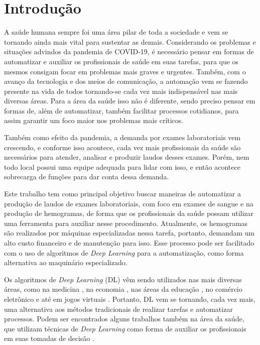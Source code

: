 \chapter{Introdução}
\label{chap:introducao}

A saúde humana sempre foi uma área pilar de toda a sociedade e vem se tornando ainda mais vital para sustentar as demais. Considerando os problemas e situações advindos da pandemia de COVID-19, é necessário pensar em formas de automatizar e auxiliar os profissionais de saúde em suas tarefas, para que os mesmos consigam focar em problemas mais graves e urgentes. Também, com o avanço da tecnologia e dos meios de comunicação, a automação vem se fazendo presente na vida de todos tornando-se cada vez mais indispensável nas mais diversas áreas. Para a área da saúde isso não é diferente, sendo preciso pensar em formas de, além de automatizar, também facilitar processos cotidianos, para assim garantir um foco maior nos problemas mais críticos.

Também como efeito da pandemia, a demanda por exames laboratoriais vem crescendo, e conforme isso acontece, cada vez mais profissionais da saúde são necessários para atender, analisar e produzir laudos desses exames. Porém, nem todo local possui uma equipe adequada para lidar com isso, e então acontece sobrecarga de funções para dar conta dessa demanda.

Este trabalho tem como principal objetivo buscar maneiras de automatizar a produção de laudos de exames laboratoriais, com foco em exames de sangue e na produção de hemogramas, de forma que os profissionais da saúde possam utilizar uma ferramenta para auxiliar nesse procedimento. Atualmente, os hemogramas são realizados por máquinas especializadas nessa tarefa, portanto, demandam um alto custo financeiro e de manutenção para isso. Esse processo pode ser facilitado com o uso de algoritmos de \emph{Deep Learning} para a automatização, como forma alternativa ao maquinário especializado.

Os algoritmos de \emph{Deep Learning} (DL) vêm sendo utilizados nas mais diversas áreas, como na medicina \cite{deepLearningMedicine}, na economia \cite{deepLearningEconomy}, nas áreas da educação \cite{deepLearningEducation}, no comércio eletrônico \cite{deepLearningEcommerce} e até em jogos virtuais \cite{deepLearningGaming}. Portanto, DL vem se tornando, cada vez mais, uma alternativa aos métodos tradicionais de realizar tarefas e automatizar processos. Podem ser encontrados alguns trabalhos também na área da saúde, que utilizam técnicas de \emph{Deep Learning} como forma de auxiliar os profissionais em suas tomadas de decisão \cite{deepLearningHealth1, deepLearningHealth2}.

